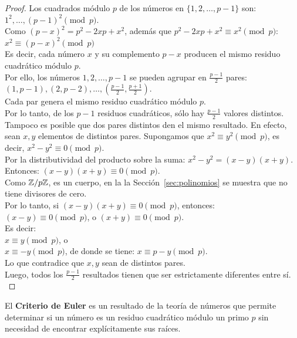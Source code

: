 \begin{proof}
Los cuadrados módulo $p$ de los números en $\{1,2,\dots,p-1\}$ son: \\
$1^2, \dots, (p-1)^2 \pmod{p}.$ \\
Como $(p-x)^2 = p^2 -2xp + x^2$, además que $p^2 -2xp + x^2 \equiv x^2 \pmod p$: \\
$x^2 \equiv (p-x)^2 \pmod{p}$ \\
Es decir, cada número $x$ y su complemento $p-x$ producen el mismo residuo cuadrático módulo $p$. \\
Por ello, los números $1,2,\dots,p-1$ se pueden agrupar en $\frac{p-1}{2}$ pares: \\
$(1, p-1), (2, p-2), \dots, \left(\tfrac{p-1}{2}, \tfrac{p+1}{2}\right)$. \\
Cada par genera el mismo residuo cuadrático módulo $p$.  \\
Por lo tanto, de los $p-1$ residuos cuadráticos, sólo hay $\frac{p-1}{2}$ valores distintos. \\
Tampoco es posible que dos pares distintos den el mismo resultado. En efecto, sean $x,y$ elementos de distintos pares. Supongamos que $x^2 \equiv y^2 \pmod p$, es decir, $x^2 - y^2 \equiv 0 \pmod p$. \\
Por la distributividad del producto sobre la suma: $x^2 - y^2 = (x-y)(x+y) $. \\
Entonces: $(x-y)(x+y) \equiv 0 \pmod{p}$. \\
Como $\mathbb{Z}/p\mathbb{Z}$, es un cuerpo, en la la Sección~\ref{sec:polinomios} se muestra que no tiene divisores de cero. \\
Por lo tanto, si $(x-y)(x+y) \equiv 0 \pmod{p}$, entonces: \\
$(x-y) \equiv 0 \pmod{p}$, o $(x+y) \equiv 0 \pmod{p}$. \\
Es decir: \\
$x \equiv y \pmod{p}$, o \\
$x \equiv -y \pmod{p}$, de donde se tiene: $x \equiv p-y \pmod{p}$.\\
Lo que contradice que $x,y$ sean de distintos pares. \\
Luego, todos los $\frac{p-1}{2}$ resultados tienen que ser estrictamente diferentes entre sí. \\
\end{proof}

El \textbf{Criterio de Euler} es un resultado de la teoría de números que permite determinar si un número es un residuo cuadrático módulo un primo $p$ sin necesidad de encontrar explícitamente sus raíces.

